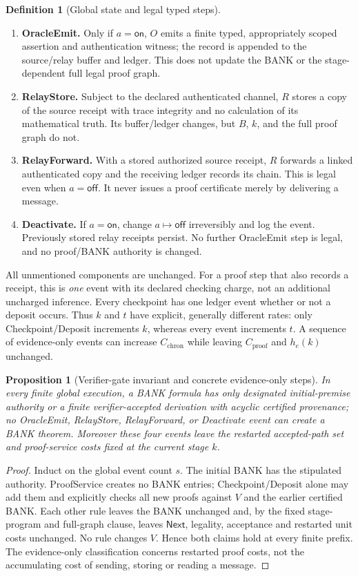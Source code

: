 \documentclass[11pt,letterpaper]{article}
\newtheorem{proposition}[theorem]{Proposition}
\theoremstyle{definition}
\newtheorem{definition}[theorem]{Definition}
\theoremstyle{remark}
\newcommand{\Next}{\mathsf{Next}}
\begin{document}
\begin{definition}[Global state and legal typed steps]
\begin{enumerate}[label=(\textsf{\Alph*}),leftmargin=11mm]
\item \textbf{OracleEmit.} Only if $a=\mathsf{on}$, $O$ emits a finite typed, appropriately scoped assertion and authentication witness; the record is appended to the source/relay buffer and ledger. This does not update the BANK or the stage-dependent full legal proof graph.
\item \textbf{RelayStore.} Subject to the declared authenticated channel, $R$ stores a copy of the source receipt with trace integrity and no calculation of its mathematical truth. Its buffer/ledger changes, but $B$, $k$, and the full proof graph do not.
\item \textbf{RelayForward.} With a stored authorized source receipt, $R$ forwards a linked authenticated copy and the receiving ledger records its chain. This is legal even when $a=\mathsf{off}$. It never issues a proof certificate merely by delivering a message.
\item \textbf{Deactivate.} If $a=\mathsf{on}$, change $a\mapsto\mathsf{off}$ irreversibly and log the event. Previously stored relay receipts persist. No further OracleEmit step is legal, and no proof/BANK authority is changed.
\end{enumerate}
All unmentioned components are unchanged. For a proof step that also records a receipt, this is \emph{one} event with its declared checking charge, not an additional uncharged inference. Every checkpoint has one ledger event whether or not a deposit occurs. Thus $k$ and $t$ have explicit, generally different rates: only Checkpoint/Deposit increments $k$, whereas every event increments $t$. A sequence of evidence-only events can increase $C_{\mathrm{chron}}$ while leaving $C_{\mathrm{proof}}$ and $h_e(k)$ unchanged.
\end{definition}

\begin{proposition}[Verifier-gate invariant and concrete evidence-only steps]
In every finite global execution, a BANK formula has only designated initial-premise authority or a finite verifier-accepted derivation with acyclic certified provenance; no OracleEmit, RelayStore, RelayForward, or Deactivate event can create a BANK theorem. Moreover these four events leave the restarted accepted-path set and proof-service costs fixed at the current stage $k$.
\end{proposition}
\begin{proof}
Induct on the global event count $s$. The initial BANK has the stipulated authority. ProofService creates no BANK entries; Checkpoint/Deposit alone may add them and explicitly checks all new proofs against $V$ and the earlier certified BANK. Each other rule leaves the BANK unchanged and, by the fixed stage-program and full-graph clause, leaves $\Next$, legality, acceptance and restarted unit costs unchanged. No rule changes $V$. Hence both claims hold at every finite prefix. The evidence-only classification concerns restarted proof costs, not the accumulating cost of sending, storing or reading a message.
\end{proof}
\end{document}
